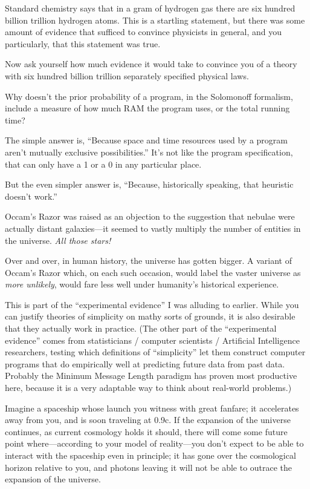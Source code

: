 {
 Standard chemistry says that in a gram of hydrogen gas there are
six hundred billion trillion hydrogen atoms. This is a startling
statement, but there was some amount of evidence that sufficed to
convince physicists in general, and you particularly, that this
statement was true.}

{
 Now ask yourself how much evidence it would take to convince you
of a theory with six hundred billion trillion separately specified
physical laws.}

{
 Why doesn't the prior probability of a program, in
the Solomonoff formalism, include a measure of how much RAM the program
uses, or the total running time?}

{
 The simple answer is, ``Because space and time
resources used by a program aren't mutually exclusive
possibilities.'' It's not like the
program specification, that can only have a 1 or a 0 in any particular
place.}

{
 But the even simpler answer is, ``Because,
historically speaking, that heuristic doesn't
work.''}

{
 Occam's Razor was raised as an objection to the
suggestion that nebulae were actually distant galaxies---it seemed to
vastly multiply the number of entities in the universe. \textit{All
those stars!}}

{
 Over and over, in human history, the universe has gotten bigger. A
variant of Occam's Razor which, on each such occasion,
would label the vaster universe as \textit{more unlikely}, would fare
less well under humanity's historical experience.}

{
 This is part of the ``experimental
evidence'' I was alluding to earlier. While you can
justify theories of simplicity on mathy sorts of grounds, it is also
desirable that they actually work in practice. (The other part of the
``experimental evidence'' comes from
statisticians / computer scientists / Artificial Intelligence
researchers, testing which definitions of
``simplicity'' let them construct
computer programs that do empirically well at predicting future data
from past data. Probably the Minimum Message Length paradigm has proven
most productive here, because it is a very adaptable way to think about
real-world problems.)}

{
 Imagine a spaceship whose launch you witness with great fanfare;
it accelerates away from you, and is soon traveling at 0.9c. If the
expansion of the universe continues, as current cosmology holds it
should, there will come some future point where---according to your
model of reality---you don't expect to be able to
interact with the spaceship even in principle; it has gone over the
cosmological horizon relative to you, and photons leaving it will not
be able to outrace the expansion of the universe.}

